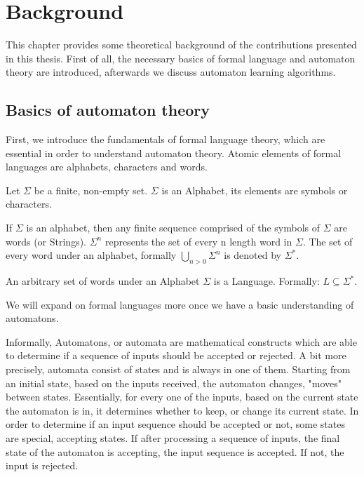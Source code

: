 \chapter{Background}

This chapter provides some theoretical background of the contributions presented in this thesis. First of all, the necessary basics of formal language and automaton theory are introduced, afterwards we discuss automaton learning algorithms.

\section{Basics of automaton theory}

First, we introduce the fundamentals of formal language theory, which are essential in order to understand automaton theory. Atomic elements of formal languages are alphabets, characters and words.

\begin{definition}[Alphabet]
	Let $\Sigma$ be a finite, non-empty set. $\Sigma$ is an Alphabet, its elements are symbols or characters.
\end{definition}

\begin{definition}[Word]
	If $\Sigma$ is an alphabet, then any finite sequence comprised of the symbols of $\Sigma$ are words (or Strings). $\Sigma^{n}$ represents the set of every n length word in $\Sigma$. The set of every word under an alphabet, formally $\bigcup\limits_{n>0}^{} \Sigma^{n}$ is denoted by $\Sigma^{*}$.
\end{definition}

\begin{definition}
	An arbitrary set of words under an Alphabet $\Sigma$ is a Language. Formally: $L\subseteq\Sigma^{*}$.
\end{definition}

We will expand on formal languages more once we have a basic understanding of automatons. 

Informally, Automatons, or automata are mathematical constructs which are able to determine if a sequence of inputs should be accepted or rejected. A bit more precisely, automata consist of states and is always in one of them. Starting from an initial state, based on the inputs received, the automaton changes, "moves" between states. Essentially, for every one of the inputs, based on the current state the automaton is in, it determines whether to keep, or change its current state. In order to determine if an input sequence should be accepted or not, some states are special, accepting states. If after processing a sequence of inputs, the final state of the automaton is accepting, the input sequence is accepted. If not, the input is rejected.


